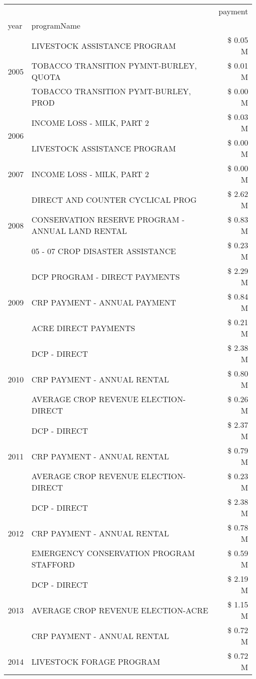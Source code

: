 \begin{tabular}{llr}
\toprule
 &  & payment \\
year & programName &  \\
\midrule
\multirow[t]{3}{*}{2005} & LIVESTOCK ASSISTANCE PROGRAM & \$ 0.05 M \\
 & TOBACCO TRANSITION PYMNT-BURLEY, QUOTA & \$ 0.01 M \\
 & TOBACCO TRANSITION PYMT-BURLEY, PROD & \$ 0.00 M \\
\cline{1-3}
\multirow[t]{2}{*}{2006} & INCOME LOSS - MILK, PART 2 & \$ 0.03 M \\
 & LIVESTOCK ASSISTANCE PROGRAM & \$ 0.00 M \\
\cline{1-3}
2007 & INCOME LOSS - MILK, PART 2 & \$ 0.00 M \\
\cline{1-3}
\multirow[t]{3}{*}{2008} & DIRECT AND COUNTER CYCLICAL PROG & \$ 2.62 M \\
 & CONSERVATION RESERVE PROGRAM - ANNUAL LAND RENTAL & \$ 0.83 M \\
 & 05 - 07 CROP DISASTER ASSISTANCE & \$ 0.23 M \\
\cline{1-3}
\multirow[t]{3}{*}{2009} & DCP PROGRAM - DIRECT PAYMENTS & \$ 2.29 M \\
 & CRP PAYMENT - ANNUAL PAYMENT & \$ 0.84 M \\
 & ACRE DIRECT PAYMENTS & \$ 0.21 M \\
\cline{1-3}
\multirow[t]{3}{*}{2010} & DCP - DIRECT & \$ 2.38 M \\
 & CRP PAYMENT - ANNUAL RENTAL & \$ 0.80 M \\
 & AVERAGE CROP REVENUE ELECTION-DIRECT & \$ 0.26 M \\
\cline{1-3}
\multirow[t]{3}{*}{2011} & DCP - DIRECT & \$ 2.37 M \\
 & CRP PAYMENT - ANNUAL RENTAL & \$ 0.79 M \\
 & AVERAGE CROP REVENUE ELECTION-DIRECT & \$ 0.23 M \\
\cline{1-3}
\multirow[t]{3}{*}{2012} & DCP - DIRECT & \$ 2.38 M \\
 & CRP PAYMENT - ANNUAL RENTAL & \$ 0.78 M \\
 & EMERGENCY CONSERVATION PROGRAM STAFFORD & \$ 0.59 M \\
\cline{1-3}
\multirow[t]{3}{*}{2013} & DCP - DIRECT & \$ 2.19 M \\
 & AVERAGE CROP REVENUE ELECTION-ACRE & \$ 1.15 M \\
 & CRP PAYMENT - ANNUAL RENTAL & \$ 0.72 M \\
\cline{1-3}
\multirow[t]{3}{*}{2014} & LIVESTOCK FORAGE PROGRAM & \$ 0.72 M \\

\end{tabular}
